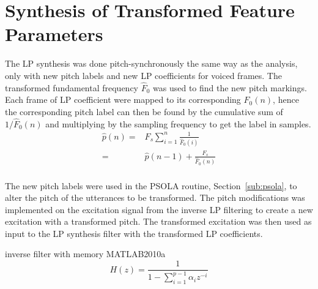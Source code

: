 
\section{Synthesis of Transformed Feature Parameters} %
\label{sec:synthesis_of_transformed_feature_parameters}

The LP synthesis was done pitch-synchronously the same way as the analysis, only with new pitch labels and new LP coefficients for voiced frames. The transformed fundamental frequency $\hat{F}_0$ was used to find the new pitch markings. Each frame of LP coefficient were mapped to its corresponding $F_0(n)$, hence the corresponding pitch label can then be found by the cumulative sum of $1/\hat{F}_0(n)$ and multiplying by the sampling frequency to get the label in samples.
\begin{equation}
	\begin{split}
		\hat{p}(n) =& F_s \sum_{i=1}^{n}\frac{1}{\hat{F}_0(i)} \\
		 =& \hat{p}(n-1) + \frac{F_s}{\hat{F}_0(n)} \\
	\end{split}
\end{equation}

The new pitch labels were used in the PSOLA routine, Section~\ref{sub:psola}, to alter the pitch of the utterances to be transformed. The pitch modifications was implemented on the excitation signal from the inverse LP filtering to create a new excitation with a transformed pitch. The transformed excitation was then used as input to the LP synthesis filter with the transformed LP coefficients. 

inverse filter with memory MATLAB\textregistered 2010a
\begin{equation}
	H(z) = \frac{1}{1 - \sum_{i=1}^{p-1} \alpha_i z^{-i}}
\end{equation}




